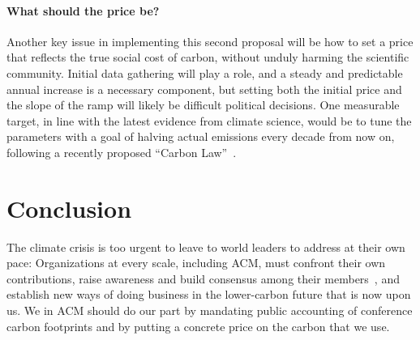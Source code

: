 \documentclass[12pt]{article}
\newcommand{\SECTION}{\section*}
\newcommand{\PARAGRAPH}{\paragraph*}
\begin{document}
\PARAGRAPH{What should the price be?}

Another key issue in implementing this second proposal will be how to
set a price that reflects the true social cost of carbon, without unduly
harming the scientific community.
%
Initial data gathering will play a role, and a steady and predictable annual
increase is a necessary component, but setting both the initial
price and the slope of the ramp will likely be difficult political
decisions.
%
One measurable target, in line with the latest evidence from climate
science, would be to tune the parameters with a goal of halving actual
emissions every decade from now on, following a recently proposed ``Carbon
Law''~\cite{Rockstrom1269}.

\SECTION{Conclusion}


The climate crisis is too urgent to leave to world leaders to address at
their own pace: Organizations at every scale, including ACM, must confront
their own contributions, raise awareness and build consensus among their
members~\cite{acm-climate}, and establish new ways of doing business in the
lower-carbon future that is now upon us.  We in ACM should do our part by
mandating public accounting of conference carbon footprints and by putting a
concrete price on the carbon that we use.






\end{document}
